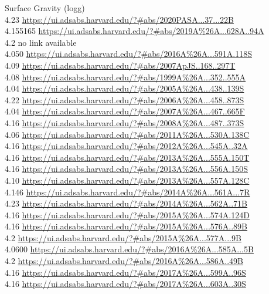 Surface Gravity (logg)\\  
4.23 \url{https://ui.adsabs.harvard.edu/?#abs/2020PASA...37...22B}\\
4.155165 \url{https://ui.adsabs.harvard.edu/?#abs/2019A%26A...628A..94A}\\
4.2 no link available\\
4.050 \url{https://ui.adsabs.harvard.edu/?#abs/2016A%26A...591A.118S}\\
4.09 \url{https://ui.adsabs.harvard.edu/?#abs/2007ApJS..168..297T}\\
4.08 \url{https://ui.adsabs.harvard.edu/?#abs/1999A%26A...352..555A}\\
4.04 \url{https://ui.adsabs.harvard.edu/?#abs/2005A%26A...438..139S}\\
4.22 \url{https://ui.adsabs.harvard.edu/?#abs/2006A%26A...458..873S}\\
4.04 \url{https://ui.adsabs.harvard.edu/?#abs/2007A%26A...467..665F}\\
4.16 \url{https://ui.adsabs.harvard.edu/?#abs/2008A%26A...487..373S}\\
4.06 \url{https://ui.adsabs.harvard.edu/?#abs/2011A%26A...530A.138C}\\
4.16 \url{https://ui.adsabs.harvard.edu/?#abs/2012A%26A...545A..32A}\\
4.16 \url{https://ui.adsabs.harvard.edu/?#abs/2013A%26A...555A.150T}\\
4.16 \url{https://ui.adsabs.harvard.edu/?#abs/2013A%26A...556A.150S}\\
4.10 \url{https://ui.adsabs.harvard.edu/?#abs/2013A%26A...557A.128C}\\
4.146 \url{https://ui.adsabs.harvard.edu/?#abs/2014A%26A...561A...7R}\\
4.23 \url{https://ui.adsabs.harvard.edu/?#abs/2014A%26A...562A..71B}\\
4.16 \url{https://ui.adsabs.harvard.edu/?#abs/2015A%26A...574A.124D}\\
4.16 \url{https://ui.adsabs.harvard.edu/?#abs/2015A%26A...576A..89B}\\
4.2 \url{https://ui.adsabs.harvard.edu/?#abs/2015A%26A...577A...9B}\\
4.0600 \url{https://ui.adsabs.harvard.edu/?#abs/2016A%26A...585A...5B}\\
4.2 \url{https://ui.adsabs.harvard.edu/?#abs/2016A%26A...586A..49B}\\
4.16 \url{https://ui.adsabs.harvard.edu/?#abs/2017A%26A...599A..96S}\\
4.16 \url{https://ui.adsabs.harvard.edu/?#abs/2017A%26A...603A..30S}\\
